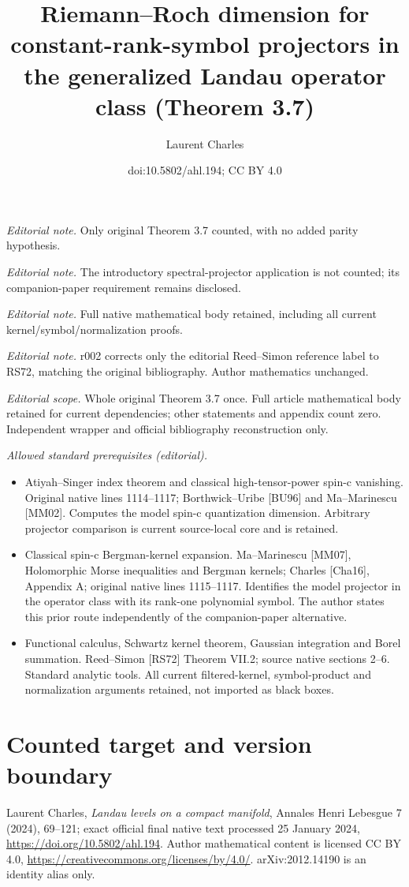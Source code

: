 \documentclass[10pt,a4paper]{article}
\title{Riemann–Roch dimension for constant-rank-symbol projectors in the generalized Landau operator class (Theorem 3.7)}
\author{Laurent Charles}
\date{doi:10.5802/ahl.194; CC BY 4.0}
\theoremstyle{definition}
\numberwithin{equation}{section}
\begin{document}
\maketitle
\noindent\textit{Editorial note.} Only original Theorem 3.7 counted, with no added parity hypothesis.\par\medskip
\noindent\textit{Editorial note.} The introductory spectral-projector application is not counted; its companion-paper requirement remains disclosed.\par\medskip
\noindent\textit{Editorial note.} Full native mathematical body retained, including all current kernel/symbol/normalization proofs.\par\medskip
\noindent\textit{Editorial note.} r002 corrects only the editorial Reed–Simon reference label to RS72, matching the original bibliography. Author mathematics unchanged.\par\medskip
\noindent\textit{Editorial scope.} Whole original Theorem 3.7 once. Full article mathematical body retained for current dependencies; other statements and appendix count zero. Independent wrapper and official bibliography reconstruction only.\par\medskip
\noindent\textit{Allowed standard prerequisites (editorial).}\begin{itemize}
\item Atiyah–Singer index theorem and classical high-tensor-power spin-c vanishing. Original native lines 1114–1117; Borthwick–Uribe [BU96] and Ma–Marinescu [MM02]. Computes the model spin-c quantization dimension. Arbitrary projector comparison is current source-local core and is retained.
\item Classical spin-c Bergman-kernel expansion. Ma–Marinescu [MM07], Holomorphic Morse inequalities and Bergman kernels; Charles [Cha16], Appendix A; original native lines 1115–1117. Identifies the model projector in the operator class with its rank-one polynomial symbol. The author states this prior route independently of the companion-paper alternative.
\item Functional calculus, Schwartz kernel theorem, Gaussian integration and Borel summation. Reed–Simon [RS72] Theorem VII.2; source native sections 2–6. Standard analytic tools. All current filtered-kernel, symbol-product and normalization arguments retained, not imported as black boxes.
\end{itemize}\medskip
\section*{Counted target and version boundary}
Laurent Charles, \emph{Landau levels on a compact manifold}, Annales Henri Lebesgue 7 (2024), 69--121; exact official final native text processed 25 January 2024, \url{https://doi.org/10.5802/ahl.194}. Author mathematical content is licensed CC BY 4.0, \url{https://creativecommons.org/licenses/by/4.0/}. arXiv:2012.14190 is an identity alias only.
\end{document}
